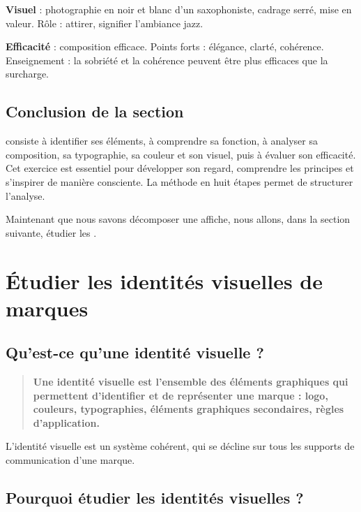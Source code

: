 \textbf{Visuel} : photographie en noir et blanc d'un saxophoniste, cadrage serré, mise en valeur. Rôle : attirer, signifier l'ambiance jazz.

\textbf{Efficacité} : composition efficace. Points forts : élégance, clarté, cohérence. Enseignement : la sobriété et la cohérence peuvent être plus efficaces que la surcharge.

\subsection*{Conclusion de la section}

\begin{retenir}
 consiste à identifier ses éléments, à comprendre sa fonction, à analyser sa composition, sa typographie, sa couleur et son visuel, puis à évaluer son efficacité. Cet exercice est essentiel pour développer son regard, comprendre les principes et s'inspirer de manière consciente. La méthode en huit étapes permet de structurer l'analyse.
\end{retenir}

Maintenant que nous savons décomposer une affiche, nous allons, dans la section suivante, étudier les .

\section{Étudier les identités visuelles de marques}

\subsection{Qu'est-ce qu'une identité visuelle ?}

\begin{quote}
\textbf{Une identité visuelle est l'ensemble des éléments graphiques qui permettent d'identifier et de représenter une marque : logo, couleurs, typographies, éléments graphiques secondaires, règles d'application.}
\end{quote}

L'identité visuelle est un système cohérent, qui se décline sur tous les supports de communication d'une marque.

\subsection{Pourquoi étudier les identités visuelles ?}


